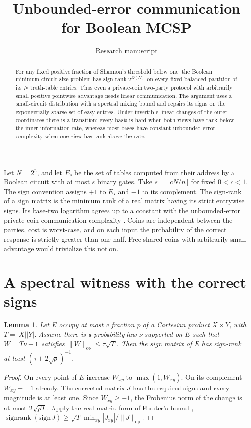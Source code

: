 \documentclass[11pt]{article}
\title{Unbounded-error communication for Boolean MCSP}
\author{Research manuscript}\date{}
\newtheorem{lemma}{Lemma}
\newcommand{\sr}{\mathop{\mathrm{signrank}}}
\begin{document}
\maketitle
\begin{abstract}
For any fixed positive fraction of Shannon's threshold below one, the Boolean minimum circuit size problem has sign-rank $2^{\Omega(N)}$ on every fixed balanced partition of its $N$ truth-table entries. Thus even a private-coin two-party protocol with arbitrarily small positive pointwise advantage needs linear communication. The argument uses a small-circuit distribution with a spectral mixing bound and repairs its signs on the exponentially sparse set of easy entries. Under invertible linear changes of the outer coordinates there is a transition: every basis is hard when both views have rank below the inner information rate, whereas most bases have constant unbounded-error complexity when one view has rank above the rate.
\end{abstract}
Let $N=2^n$, and let $E_s$ be the set of tables computed from their address by a Boolean circuit with at most $s$ binary gates. Take $s=\lfloor cN/n\rfloor$ for fixed $0<c<1$. The sign convention assigns $+1$ to $E_s$ and $-1$ to its complement. The sign-rank of a sign matrix is the minimum rank of a real matrix having its strict entrywise signs. Its base-two logarithm agrees up to a constant with the unbounded-error private-coin communication complexity \cite{ps}. Coins are independent between the parties, cost is worst-case, and on each input the probability of the correct response is strictly greater than one half. Free shared coins with arbitrarily small advantage would trivialize this notion.

\section{A spectral witness with the correct signs}
\begin{lemma}\label{repair}
Let $E$ occupy at most a fraction $p$ of a Cartesian product $X\times Y$, with $T=|X||Y|$. Assume there is a probability law $\nu$ supported on $E$ such that $W=T\nu-\mathbf 1$ satisfies $\|W\|_{\mathrm{op}}\le\tau\sqrt T$. Then the sign matrix of $E$ has sign-rank at least $(\tau+2\sqrt p)^{-1}$.
\end{lemma}
\begin{proof}
On every point of $E$ increase $W_{xy}$ to $\max(1,W_{xy})$. On its complement $W_{xy}=-1$ already. The corrected matrix $J$ has the required signs and every magnitude is at least one. Since $W_{xy}\ge-1$, the Frobenius norm of the change is at most $2\sqrt{pT}$. Apply the real-matrix form of Forster's bound \cite[eq.~(5.1)]{rs}, $\sr(\mathrm{sign}\,J)\ge \sqrt T\min_{xy}|J_{xy}|/\|J\|_{\mathrm{op}}$.
\end{proof}
\end{document}
